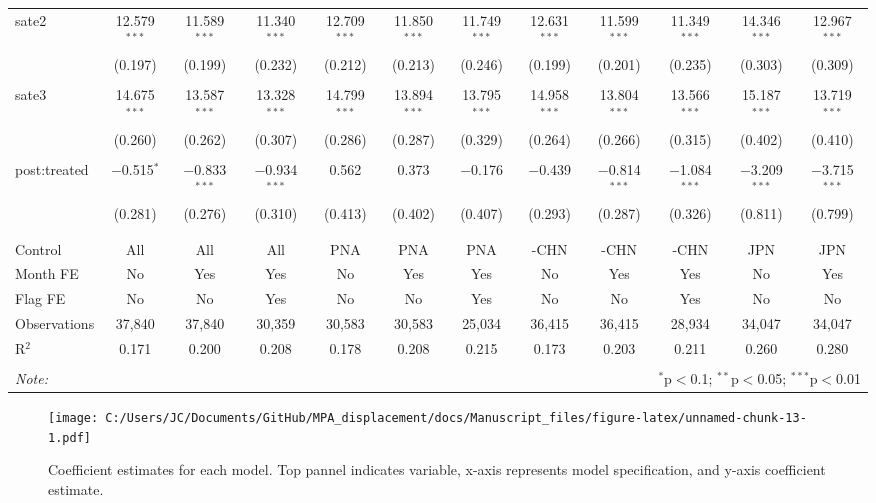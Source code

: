 \documentclass[11pt,]{article}
\begin{document}
\begin{landscape}
\begin{table}[!htbp]
\begin{tabular}{@{\extracolsep{1pt}}lccccccccccc}
 sate2 & 12.579$^{***}$ & 11.589$^{***}$ & 11.340$^{***}$ & 12.709$^{***}$ & 11.850$^{***}$ & 11.749$^{***}$ & 12.631$^{***}$ & 11.599$^{***}$ & 11.349$^{***}$ & 14.346$^{***}$ & 12.967$^{***}$ \\ 
  & (0.197) & (0.199) & (0.232) & (0.212) & (0.213) & (0.246) & (0.199) & (0.201) & (0.235) & (0.303) & (0.309) \\ 
  & & & & & & & & & & & \\ 
 sate3 & 14.675$^{***}$ & 13.587$^{***}$ & 13.328$^{***}$ & 14.799$^{***}$ & 13.894$^{***}$ & 13.795$^{***}$ & 14.958$^{***}$ & 13.804$^{***}$ & 13.566$^{***}$ & 15.187$^{***}$ & 13.719$^{***}$ \\ 
  & (0.260) & (0.262) & (0.307) & (0.286) & (0.287) & (0.329) & (0.264) & (0.266) & (0.315) & (0.402) & (0.410) \\ 
  & & & & & & & & & & & \\ 
 post:treated & $-$0.515$^{*}$ & $-$0.833$^{***}$ & $-$0.934$^{***}$ & 0.562 & 0.373 & $-$0.176 & $-$0.439 & $-$0.814$^{***}$ & $-$1.084$^{***}$ & $-$3.209$^{***}$ & $-$3.715$^{***}$ \\ 
  & (0.281) & (0.276) & (0.310) & (0.413) & (0.402) & (0.407) & (0.293) & (0.287) & (0.326) & (0.811) & (0.799) \\ 
  & & & & & & & & & & & \\ 
\hline \\[-1.8ex] 
Control & All & All & All & PNA & PNA & PNA & -CHN & -CHN & -CHN & JPN & JPN \\ 
Month FE & No & Yes & Yes & No & Yes & Yes & No & Yes & Yes & No & Yes \\ 
Flag FE & No & No & Yes & No & No & Yes & No & No & Yes & No & No \\ 
Observations & 37,840 & 37,840 & 30,359 & 30,583 & 30,583 & 25,034 & 36,415 & 36,415 & 28,934 & 34,047 & 34,047 \\ 
R$^{2}$ & 0.171 & 0.200 & 0.208 & 0.178 & 0.208 & 0.215 & 0.173 & 0.203 & 0.211 & 0.260 & 0.280 \\ 
\hline 
\hline \\[-1.8ex] 
\textit{Note:}  & \multicolumn{11}{r}{$^{*}$p$<$0.1; $^{**}$p$<$0.05; $^{***}$p$<$0.01} \\ 
\end{tabular} 
\end{table} 

\end{landscape}
\clearpage

\begin{figure}
\centering
\texttt{[image: C:/Users/JC/Documents/GitHub/MPA\_displacement/docs/Manuscript\_files/figure-latex/unnamed-chunk-13-1.pdf]}
\caption{\label{fig:unnamed-chunk-13}\label{fig:long}Coefficient estimates
for each model. Top pannel indicates variable, x-axis represents model
specification, and y-axis coefficient estimate.}
\end{figure}
\end{document}
